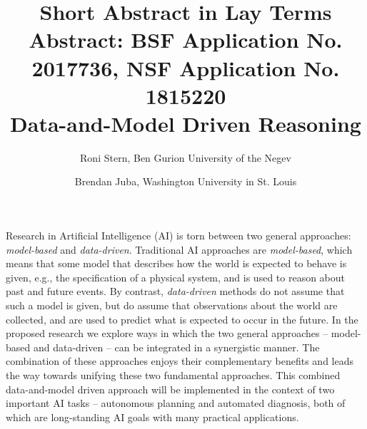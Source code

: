 \documentclass[12pt]{article}
\begin{document}
\title{Short Abstract in Lay Terms \\
\large{Abstract: BSF Application No. 2017736, NSF Application No. 1815220}\\
\Large{Data-and-Model Driven Reasoning}}
\date{\vspace{-0.5cm}}
\author{Roni Stern, Ben Gurion University of the Negev \and Brendan Juba, Washington University in St. Louis}
\maketitle

Research in Artificial Intelligence (AI) is torn between two general approaches: {\em model-based} and {\em data-driven}. 
Traditional AI approaches are {\em model-based}, which means that some model that describes how the world is expected to behave is given, e.g., the specification of a physical system, and is used to reason about past and future events. By contrast, {\em data-driven} methods do not assume that such a model is given, but do assume that observations about the world are collected, and are used to predict what is expected to occur in the future. 
In the proposed research we explore ways in which the two general approaches -- model-based and data-driven -- 
can be integrated in a synergistic manner. The combination of these approaches enjoys their complementary benefits and leads the way towards unifying these two fundamental approaches. 
This combined data-and-model driven approach will be implemented in the context of two important AI tasks -- autonomous planning and automated diagnosis, both of which are long-standing AI goals with many practical applications.
\end{document}
